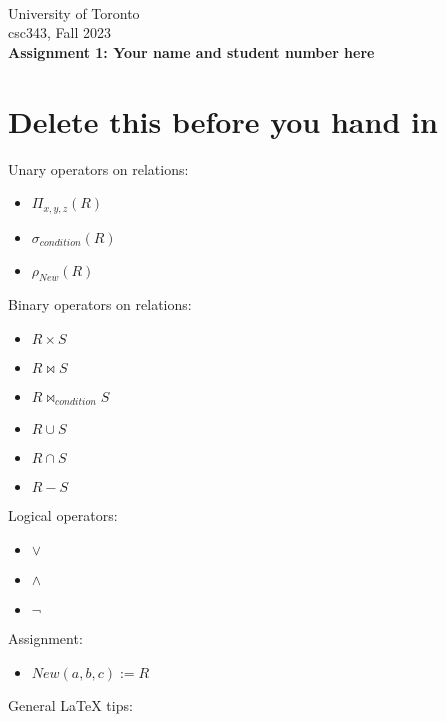 \documentclass{article}
\begin{document}
~~~\vspace{-2.0cm}

\noindent
University of Toronto\\
{\sc csc}343, Fall 2023\\[10pt]
{\LARGE\bf Assignment 1: Your name and student number here}

\section*{Delete this before you hand in}

\noindent
Unary operators on relations:
\begin{itemize}
\item $\Pi_{x, y, z} (R)$
\item $\sigma_{condition} (R) $
\item $\rho_{New} (R) $
\end{itemize}
Binary operators on relations:
\begin{itemize}
\item $R \times S$
\item $R \bowtie S$
\item $R \bowtie_{condition} S$
\item $R \cup S$
\item $R \cap S$
\item $R - S$
\end{itemize}
Logical operators:
\begin{itemize}
\item $\vee$
\item $\wedge$
\item $\neg$
\end{itemize}
Assignment:
\begin{itemize}
\item $New(a, b, c) := R$
\end{itemize}
General LaTeX tips:
\end{document}
